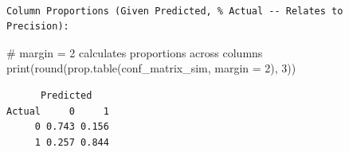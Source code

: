 \documentclass[
  letterpaper,
  DIV=11,
  numbers=noendperiod]{scrreprt}
\newenvironment{Shaded}{\begin{snugshade}}{\end{snugshade}}
\newcommand{\AttributeTok}[1]{\textcolor[rgb]{0.40,0.45,0.13}{#1}}
\newcommand{\CommentTok}[1]{\textcolor[rgb]{0.37,0.37,0.37}{#1}}
\newcommand{\DecValTok}[1]{\textcolor[rgb]{0.68,0.00,0.00}{#1}}
\newcommand{\FunctionTok}[1]{\textcolor[rgb]{0.28,0.35,0.67}{#1}}
\newcommand{\NormalTok}[1]{\textcolor[rgb]{0.00,0.23,0.31}{#1}}
\begin{document}
\begin{verbatim}

Column Proportions (Given Predicted, % Actual -- Relates to Precision):
\end{verbatim}

\begin{Shaded}
\begin{Highlighting}[]
\CommentTok{\# margin = 2 calculates proportions across columns}
\FunctionTok{print}\NormalTok{(}\FunctionTok{round}\NormalTok{(}\FunctionTok{prop.table}\NormalTok{(conf\_matrix\_sim, }\AttributeTok{margin =} \DecValTok{2}\NormalTok{), }\DecValTok{3}\NormalTok{))}
\end{Highlighting}
\end{Shaded}

\begin{verbatim}
      Predicted
Actual     0     1
     0 0.743 0.156
     1 0.257 0.844
\end{verbatim}
\end{document}
